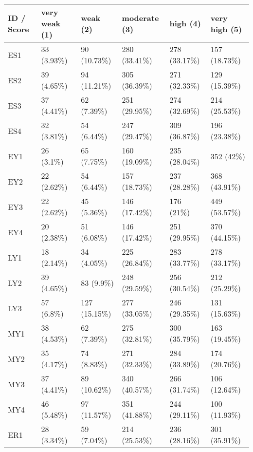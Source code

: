 \documentclass[preprint,12pt]{elsarticle}
\begin{document}
\begin{table}[]
\footnotesize
\begin{tabular}{|l|l|l|l|l|l|}
\hline
\textbf{ID} / \textbf{Score} & \textbf{very weak (1)} & \textbf{weak (2)} & \textbf{moderate (3)}  & \textbf{high (4)} & \textbf{very high (5)} \\ \hline
ES1               & 33 (3.93\%)   & 90 (10.73\%)  & 280 (33.41\%) & 278 (33.17\%) & 157 (18.73\%) \\ \hline
ES2               & 39 (4.65\%)   & 94 (11.21\%)  & 305 (36.39\%) & 271 (32.33\%) & 129 (15.39\%) \\ \hline
ES3               & 37 (4.41\%)   & 62 (7.39\%)   & 251 (29.95\%) & 274 (32.69\%) & 214 (25.53\%) \\ \hline
ES4               & 32 (3.81\%)   & 54 (6.44\%)   & 247 (29.47\%) & 309 (36.87\%) & 196 (23.38\%) \\ \hline
EY1               & 26 (3.1\%)    & 65 (7.75\%)   & 160 (19.09\%) & 235 (28.04\%) & 352 (42\%)    \\ \hline
EY2               & 22 (2.62\%)   & 54 (6.44\%)   & 157 (18.73\%) & 237 (28.28\%) & 368 (43.91\%) \\ \hline
EY3               & 22 (2.62\%)   & 45 (5.36\%)   & 146 (17.42\%) & 176 (21\%)    & 449 (53.57\%) \\ \hline
EY4               & 20 (2.38\%)   & 51 (6.08\%)   & 146 (17.42\%) & 251 (29.95\%) & 370 (44.15\%) \\ \hline
LY1               & 18 (2.14\%)   & 34 (4.05\%)   & 225 (26.84\%) & 283 (33.77\%) & 278 (33.17\%) \\ \hline
LY2               & 39 (4.65\%)   & 83 (9.9\%)    & 248 (29.59\%) & 256 (30.54\%) & 212 (25.29\%) \\ \hline
LY3               & 57 (6.8\%)    & 127 (15.15\%) & 277 (33.05\%) & 246 (29.35\%) & 131 (15.63\%) \\ \hline
MY1               & 38 (4.53\%)   & 62 (7.39\%)   & 275 (32.81\%) & 300 (35.79\%) & 163 (19.45\%) \\ \hline
MY2               & 35 (4.17\%)   & 74 (8.83\%)   & 271 (32.33\%) & 284 (33.89\%) & 174 (20.76\%) \\ \hline
MY3               & 37 (4.41\%)   & 89 (10.62\%)  & 340 (40.57\%) & 266 (31.74\%) & 106 (12.64\%) \\ \hline
MY4               & 46 (5.48\%)   & 97 (11.57\%)  & 351 (41.88\%) & 244 (29.11\%) & 100 (11.93\%) \\ \hline
ER1               & 28 (3.34\%)   & 59 (7.04\%)   & 214 (25.53\%) & 236 (28.16\%) & 301 (35.91\%) \\ \hline

\end{tabular}
\end{table}
\end{document}
